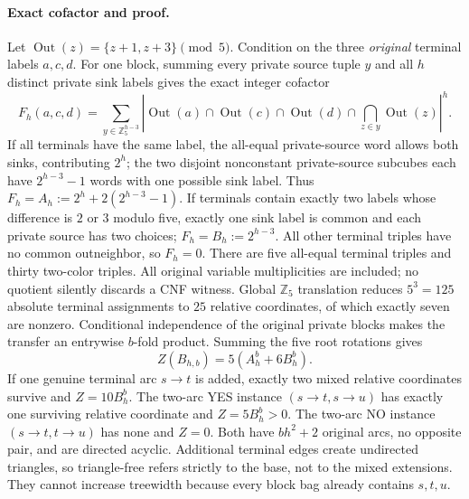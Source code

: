 \documentclass[11pt]{article}
\begin{document}
\paragraph{Exact cofactor and proof.}
Let $\operatorname{Out}(z)=\{z+1,z+3\}\pmod5$.
Condition on the three \emph{original} terminal labels $a,c,d$.
For one block, summing every private source tuple $y$ and all
$h$ distinct private sink labels gives the exact integer cofactor
\[
F_h(a,c,d)=
\sum_{y\in\mathbb Z_5^{h-3}}
\left|\operatorname{Out}(a)\cap\operatorname{Out}(c)
\cap\operatorname{Out}(d)\cap
\bigcap_{z\in y}\operatorname{Out}(z)\right|^h.
\]
If all terminals have the same label, the all-equal private-source
word allows both sinks, contributing $2^h$; the two disjoint
nonconstant private-source subcubes each have $2^{h-3}-1$
words with one possible sink label. Thus
$F_h=A_h:=2^h+2(2^{h-3}-1)$.
If terminals contain exactly two labels whose difference is
$2$ or $3$ modulo five, exactly one sink label is common and each
private source has two choices; $F_h=B_h:=2^{h-3}$.
All other terminal triples have no common outneighbor, so $F_h=0$.
There are five all-equal terminal triples and thirty two-color
triples. All original variable multiplicities are included;
no quotient silently discards a CNF witness.
Global $\mathbb Z_5$ translation reduces $5^3=125$ absolute
terminal assignments to $25$ relative coordinates, of which
exactly seven are nonzero. Conditional independence of
the original private blocks makes the transfer an entrywise
$b$-fold product. Summing the five root rotations gives
\[
\boxed{Z(B_{h,b})=5(A_h^b+6B_h^b).}
\]
If one genuine terminal arc $s\to t$ is added, exactly two
mixed relative coordinates survive and $Z=10B_h^b$.
The two-arc YES instance
$(s\to t,s\to u)$ has exactly one surviving relative
coordinate and $Z=5B_h^b>0$. The two-arc NO instance
$(s\to t,t\to u)$ has none and $Z=0$.
Both have $bh^2+2$ original arcs, no opposite pair,
and are directed acyclic. Additional terminal edges create
undirected triangles, so triangle-free refers strictly to
the base, not to the mixed extensions. They cannot increase
treewidth because every block bag already contains $s,t,u$.
\end{document}
